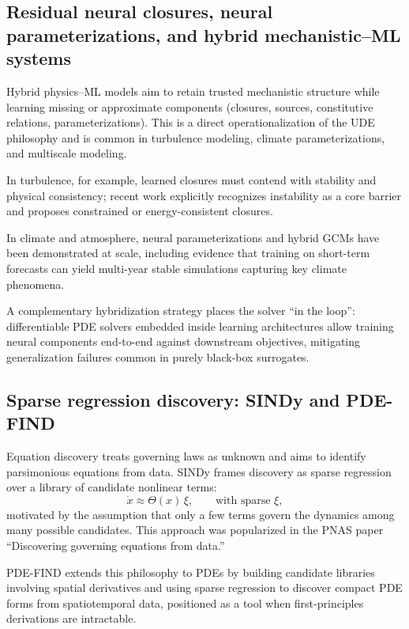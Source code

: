 \documentclass[11pt]{article}
\begin{document}
\subsection{Residual neural closures, neural parameterizations, and hybrid mechanistic--ML systems}

Hybrid physics--ML models aim to retain trusted mechanistic structure while learning missing or approximate components (closures, sources, constitutive relations, parameterizations). This is a direct operationalization of the UDE philosophy and is common in turbulence modeling, climate parameterizations, and multiscale modeling.

In turbulence, for example, learned closures must contend with stability and physical consistency; recent work explicitly recognizes instability as a core barrier and proposes constrained or energy-consistent closures.

In climate and atmosphere, neural parameterizations and hybrid GCMs have been demonstrated at scale, including evidence that training on short-term forecasts can yield multi-year stable simulations capturing key climate phenomena.

A complementary hybridization strategy places the solver ``in the loop'': differentiable PDE solvers embedded inside learning architectures allow training neural components end-to-end against downstream objectives, mitigating generalization failures common in purely black-box surrogates.

\subsection{Sparse regression discovery: SINDy and PDE-FIND}

Equation discovery treats governing laws as unknown and aims to identify parsimonious equations from data. SINDy frames discovery as sparse regression over a library of candidate nonlinear terms:
\begin{equation}
\dot x \approx \Theta(x)\,\xi,\qquad \text{with sparse } \xi,
\end{equation}
motivated by the assumption that only a few terms govern the dynamics among many possible candidates. This approach was popularized in the PNAS paper ``Discovering governing equations from data.''

PDE-FIND extends this philosophy to PDEs by building candidate libraries involving spatial derivatives and using sparse regression to discover compact PDE forms from spatiotemporal data, positioned as a tool when first-principles derivations are intractable.
\end{document}
